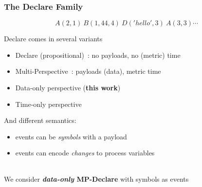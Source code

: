 \documentclass{beamer}
\begin{document}
\begin{frame}
\frametitle{The Declare Family}

		$$A(2,1)~B(1,44,4)~D('hello',3)~A(3,3)\cdots$$ 

Declare comes in several variants

\begin{itemize}
	\item Declare (propositional)~\cite{}: no payloads, no (metric) time
	\item Multi-Perspective~\cite{}: payloads (data), metric time
	\item Data-only perspective ({\bf this work})
	\item Time-only perspective
\end{itemize}

And different semantics:
\begin{itemize}
	\item events can be \emph{symbols} with a payload
	\item events can encode \emph{changes} to process variables
\end{itemize}

~\\

We consider {\bf \emph{data-only} MP-Declare} with symbols as events

\end{frame}

\end{document}
